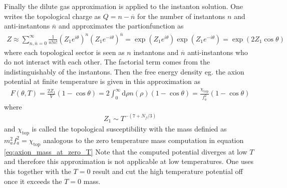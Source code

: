 \documentclass[a4paper, 12pt]{article}
\newcommand{\diff}{\mathrm{d}}
\begin{document}
Finally the dilute gas approximation is applied to the instanton solution. One writes the topological charge as $Q = n - \overline{n}$ for the number of instantons
$n$ and anti-instantons $\overline{n}$ and approximates the partionfunction as
\cite[Chap. 7, Eq. 3.55]{Symmetry}
\begin{align*}
    Z \approx \sum_{n,\overline{n} = 0}^\infty \frac{1}{n! \overline{n}!} \left(Z_1 e^{i \theta}\right)^n \left(Z_1 e^{- i \theta}\right)^{\overline{n}}
    = \exp \left( Z_1 e^{i \theta} \right) \exp \left( Z_1 e^{- i \theta} \right) = \exp (2 Z_1 \cos \theta)
\end{align*}
where each topological
sector is seen as $n$ instantons and
$\overline{n}$ anti-instantons
who do not interact with each other.
The factorial term comes from
the indistinguishably of the instantons.
Then the free energy density eg. the axion potential at finite temperature is given in this approximation as
\begin{align}
    \label{eq:diga_axion_potential}
    F(\theta, T) = \frac{2 Z_1}{V} (1 - \cos \theta) = 2 \int_0^\infty \diff \rho n(\rho) (1 - \cos \theta) = \frac{\chi_\mathrm{top}}{f_a^2} (1 - \cos \theta)
\end{align}
where
\begin{align}
    \label{eq:temp_dep_mass_diga}
    Z_1 \sim T^{-(7 + N_f / 3)}
\end{align}
and $\chi_\mathrm{top}$ is called the topological susceptibility with the mass definied as $m_a^2 f_a^2 = \chi_\mathrm{top}$
analogous to the zero temperature mass computation in equation \ref{eq:axion_mass_at_zero_T}
Note that the computed potential diverges at low $T$ and therefore this approximation is not applicable at low temperatures. One uses this
together with the $T = 0$ result and cut the high temperature potential
off once it exceeds the $T = 0$ mass.
\end{document}
